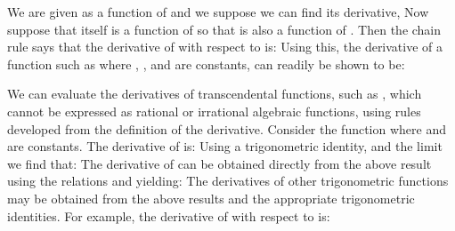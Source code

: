 {{We are given  as a function of  and we suppose we can find its derivative,
%
%
Now suppose that  itself is a function of  so that  is also a function of .
Then the chain rule says that the derivative of  with respect to  is:
%
%
Using this, the derivative of a function such as
%
%
where , , and  are constants, can readily be shown to be: 
%
}
%
%
%
\par{We can evaluate the derivatives of transcendental functions, such as
, which cannot be expressed as rational or irrational algebraic
functions, using rules developed from the definition of the derivative.
Consider the function  where  and \m{\delta}
are constants.
The derivative of  is:
%
%
Using a trigonometric identity,
%
%
%
and the limit 
%
%
we find that: 
%
The derivative of  can be obtained directly from the
above result using the relations
%
%
and
%
%
yielding:
%
The derivatives of other trigonometric functions may be obtained from the
above results and the appropriate trigonometric identities.
For example, the derivative of \m{\tan\theta} with respect to \m{\theta} is:
}}
